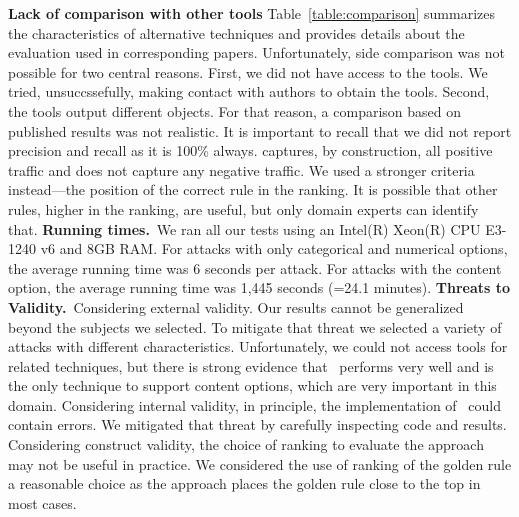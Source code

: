 \documentclass[conference]{IEEEtran}
\begin{document}



\noindent\textbf{Lack of comparison with other tools}
Table~\ref{table:comparison} summarizes the characteristics of
alternative techniques and provides details about the evaluation used
in corresponding papers. Unfortunately, side comparison was not
possible for two central reasons. First, we did not have access to the
tools. We tried, unsuccssefully, making contact with authors to obtain
the tools. Second, the tools output different objects. For that
reason, a comparison based on published results was not realistic. It
is important to recall that we did not report precision and recall as
it is 100\% always. \tname captures, by construction, all positive
traffic and does not capture any negative traffic. We used a stronger
criteria instead---the position of the correct rule in the ranking. It
is possible that other rules, higher in the ranking, are useful, but
only domain experts can identify that.
\noindent\textbf{Running times.}~We ran all our tests using an
Intel(R) Xeon(R) CPU E3-1240 v6 and 8GB RAM. For attacks with only
categorical and numerical options, the average running time was 6
seconds per attack. For attacks with the content option, the average
running time was 1,445 seconds (=24.1 minutes).  \textbf{Threats to
  Validity.}~Considering external validity. Our results cannot be
generalized beyond the subjects we selected. To mitigate that threat
we selected a variety of attacks with different
characteristics. Unfortunately, we could not access tools for related
techniques, but there is strong evidence that \tname\ performs very
well and is the only technique to support content options, which are
very important in this domain. Considering internal validity, in
principle, the implementation of \tname\ could contain errors. We
mitigated that threat by carefully inspecting code and
results. Considering construct validity, the choice of ranking to
evaluate the approach may not be useful in practice. We considered the
use of ranking of the golden rule a reasonable choice as the approach
places the golden rule close to the top in most cases.
\end{document}
